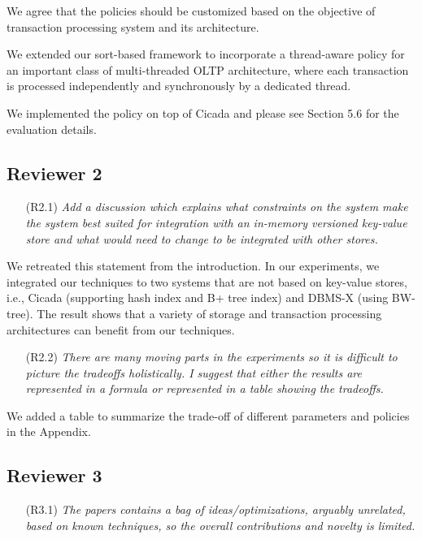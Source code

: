 \documentclass{article}
\newcommand{\todo}[1]{}
\newcommand{\changed}[1]{#1}
\newcommand{\todo}[1]{\textcolor{red}{\bf [TODO!: #1]}}
\newcommand{\changed}[1]{{\color{blue}#1}}
\begin{document}
\changed{
We agree that the policies should be customized based on the objective of transaction processing system and its architecture.

We extended our sort-based framework to incorporate a thread-aware policy for an important class of multi-threaded OLTP architecture, where each transaction is processed independently and synchronously by a dedicated thread.

We implemented the policy on top of Cicada and please see Section 5.6 for the evaluation details.
}

\subsection{Reviewer 2}

\begin{itemize}
\item[(R2.1)] \emph{Add a discussion which explains what constraints on the system make the system best suited for integration with an in-memory versioned key-value store and what would need to change to be integrated with other stores.}
\end{itemize}

\changed{
	We retreated this statement from the introduction. In our experiments, we integrated our techniques to two systems that are not based on key-value stores, i.e., Cicada (supporting hash index and B+ tree index) and DBMS-X (using BW-tree). The result shows that a variety of storage and transaction processing architectures can benefit from our techniques.
}

\begin{itemize}
\item[(R2.2)] \emph{There are many moving parts in the experiments so it is difficult to picture the tradeoffs holistically. I suggest that either the results are represented in a formula or represented in a table showing the tradeoffs.}
\end{itemize}

\todo{Add to appendix}
\changed{
	We added a table to summarize the trade-off of different parameters and policies in the Appendix.
}

\subsection{Reviewer 3}

\begin{itemize}
\item[(R3.1)] \emph{The papers contains a bag of ideas/optimizations, arguably unrelated,
	based on known techniques, so the overall contributions and novelty is
	limited.}
\end{itemize}
\end{document}
